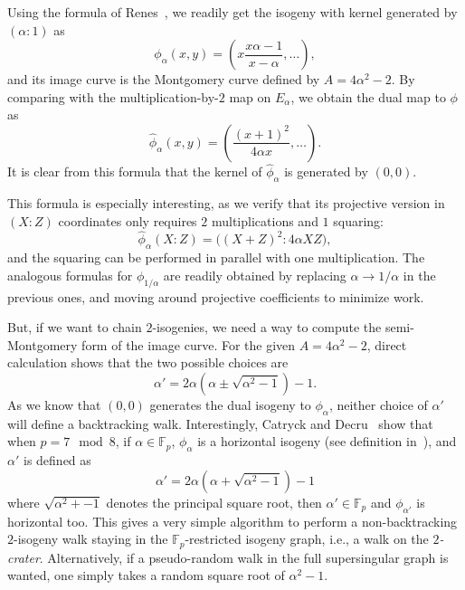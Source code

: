 \documentclass{llncs}
\newcommand{\F}{\mathbb{F}}
\begin{document}
Using the formula of Renes~\cite{10.1007/978-3-319-79063-3_11}, we
readily get the isogeny with kernel generated by
$(\alpha:1)$ as
\begin{equation}
  \label{eq:isog-forward}
  \phi_\alpha(x,y) = \left(x\frac{x\alpha - 1}{x - \alpha}, \dots\right),
\end{equation}
and its image curve is the Montgomery curve defined by
$A = 4\alpha^2-2$. %
By comparing with the multiplication-by-$2$ map on $E_\alpha$, we
obtain the dual map to $\phi$ as
\begin{equation}
  \label{eq:isog-backward}
  \hat\phi_\alpha(x,y) = \left(\frac{(x+1)^2}{4\alpha x}, \dots\right).
\end{equation}
It is clear from this formula that the kernel of $\hat\phi_\alpha$ is
generated by $(0,0)$.

This formula is especially interesting, as we verify that its
projective version in $(X:Z)$ coordinates only requires $2$
multiplications and $1$ squaring:
\begin{equation}
  \label{eq:isog-proj}
  \hat\phi_\alpha(X:Z) = \bigl((X+Z)^2 : 4\alpha XZ\bigr),
\end{equation}
and the squaring can be performed in parallel with one
multiplication. %
The analogous formulas for $\phi_{1/\alpha}$ are readily obtained by
replacing $\alpha\to 1/\alpha$ in the previous ones, and moving around
projective coefficients to minimize work.

But, if we want to chain $2$-isogenies, we need a way to compute the
semi-Montgomery form of the image curve. %
For the given $A=4\alpha^2-2$, direct calculation shows that the two
possible choices are
\begin{equation}
  \label{eq:next-curve}
  \alpha' = 2\alpha\left(\alpha \pm \sqrt{\alpha^2 - 1}\right) - 1.
\end{equation}
As we know that $(0,0)$ generates the dual isogeny to $\phi_\alpha$,
neither choice of $\alpha'$ will define a backtracking walk. %
Interestingly, Catryck and Decru~\cite{cryptoeprint:2019:1404} show
that when $p=7\mod 8$, if $\alpha\in\F_p$, $\phi_\alpha$ is a
horizontal isogeny (see definition in~\cite{cryptoeprint:2019:1404}),
and $\alpha'$ is defined as
\[\alpha' = 2\alpha\left(\alpha + \sqrt{\alpha^2 - 1}\right) - 1\]
where $\sqrt{\alpha^2+-1}$ denotes the principal square root, then
$\alpha'\in\F_p$ and $\phi_{\alpha'}$ is horizontal too. %
This gives a very simple algorithm to perform a non-backtracking
$2$-isogeny walk staying in the $\F_p$-restricted isogeny graph, i.e.,
a walk on the \emph{$2$-crater}. %
Alternatively, if a pseudo-random walk in the full supersingular graph
is wanted, one simply takes a random square root of $\alpha^2-1$.
\end{document}
